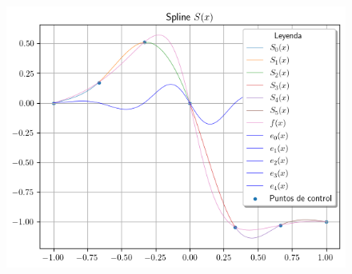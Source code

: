 \begin{frame}
    \begin{solution}
        \begin{figure}[ht!]
            \centering
            \includegraphics[width=.65\paperwidth]{8}
        \end{figure}
    \end{solution}
\end{frame}
